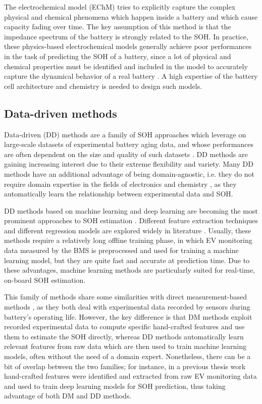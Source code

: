 The electrochemical model (EChM) \cite{survey1} tries to explicitly capture the complex physical and chemical phenomena which happen inside a battery and which cause capacity fading over time. The key assumption of this method is that the impedance spectrum of the battery is strongly related to the SOH. In practice, these physics-based electrochemical models generally achieve poor performances in the task of predicting the SOH of a battery, since a lot of physical and chemical properties must be identified and included in the model to accurately capture the dynamical behavior of a real battery \cite{survey2}. A high expertise of the battery cell architecture and chemistry is needed to design such models.

\subsection{Data-driven methods}
\label{sec:dd_methods}
Data-driven (DD) methods are a family of SOH approaches which leverage on large-scale datasets of experimental battery aging data, and whose performances are often dependent on the size and quality of such datasets \cite{survey5}. DD methods are gaining increasing interest due to their extreme flexibility and variety. Many DD methods have an additional advantage of being domain-agnostic, i.e. they do not require domain expertise in the fields of electronics and chemistry \cite{survey4}, as they automatically learn the relationship between experimental data and SOH.

DD methods based on machine learning and deep learning are becoming the most prominent approaches to SOH estimation \cite{survey2,survey3,survey4,survey5,tesi_filippo}. Different feature extraction techniques and different regression models are explored widely in literature \cite{survey1}. Usually, these methods require a relatively long offline training phase, in which EV monitoring data measured by the BMS is preprocessed and used for training a machine learning model, but they are quite fast and accurate at prediction time. Due to these advantages, machine learning methods are particularly suited for real-time, on-board SOH estimation.

This family of methods share some similarities with direct measurement-based methods \cite{survey5}, as they both deal with experimental data recorded by sensors during battery's operating life. However, the key difference is that DM methods exploit recorded experimental data to compute specific hand-crafted features and use them to estimate the SOH directly, whereas DD methods automatically learn relevant features from raw data which are then used to train machine learning models, often without the need of a domain expert. Nonetheless, there can be a bit of overlap between the two families; for instance, in a previous thesis work \cite{tesi_filippo} hand-crafted features were identified and extracted from raw EV monitoring data and used to train deep learning models for SOH prediction, thus taking advantage of both DM and DD methods.


